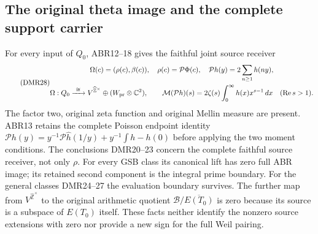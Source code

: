 \subsection{The original theta image and the complete support carrier}

For every input of $Q_0$, ABR12--18 gives the faithful joint
source receiver
\begin{equation}\tag{DMR28}
\begin{gathered}
\Omega(c)=(\rho(c),\beta(c)),\quad
\rho(c)=\mathcal P\Phi(c),\quad
\mathcal Ph(y)=2\sum_{n\ge1}h(ny),\\
\Omega:Q_0\xrightarrow{\ \cong\ }
              V^{\widehat{\mathbb Z}^{\times}}
                  \oplus(W_{\rm pr}\otimes\mathbb C^2),\qquad
\mathcal M(\mathcal Ph)(s)=2\zeta(s)
                       \int_0^\infty h(x)x^{s-1}\,dx
                        \quad(\operatorname{Re}s>1).
\end{gathered}
\end{equation}
The factor two, original zeta function and original Mellin
measure are present. ABR13 retains the complete Poisson
endpoint identity
$\mathcal Ph(y)=y^{-1}\mathcal P\widehat h(1/y)
 +y^{-1}\int h-h(0)$ before applying the two moment conditions.
The conclusions DMR20--23 concern the complete faithful
source receiver, not only $\rho$. For every GSB class its
canonical lift has zero full ABR image; its retained second
component is the integral prime boundary. For the general
classes DMR24--27 the evaluation boundary survives. The further
map from $V^{\widehat{\mathbb Z}^{\times}}$ to the original
arithmetic quotient $\mathscr B/\overline{E(T_0)}$ is zero
because its source is a subspace of $E(T_0)$ itself. These
facts neither identify the nonzero source extensions with
zero nor provide a new sign for the full Weil pairing.

